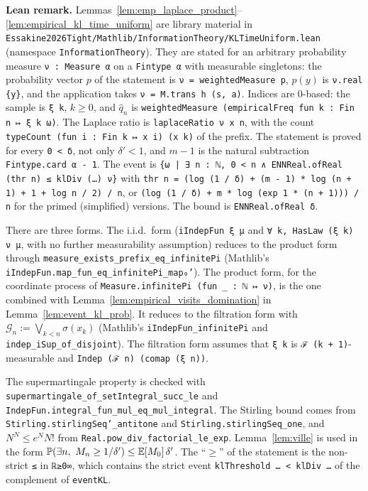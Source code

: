 \textbf{Lean remark.} Lemmas~\ref{lem:emp_laplace_product}--\ref{lem:empirical_kl_time_uniform}
are library material in \texttt{Essakine2026Tight/Mathlib/InformationTheory/KLTimeUniform.lean}
(namespace \texttt{InformationTheory}). They are stated for an arbitrary probability measure
\texttt{ν : Measure α} on a \texttt{Fintype α} with measurable singletons: the probability vector
$p$ of the statement is \texttt{ν = weightedMeasure p}, $p(y)$ is \texttt{ν.real \{y\}}, and the
application takes \texttt{ν = M.trans h (s, a)}. Indices are $0$-based: the sample is
\texttt{ξ k}, $k \ge 0$, and $\hat q_n$ is
\texttt{weightedMeasure (empiricalFreq fun k : Fin n ↦ ξ k ω)}. The Laplace ratio is
\texttt{laplaceRatio ν x n}, with the count \texttt{typeCount (fun i : Fin k ↦ x i) (x k)} of the
prefix. The statement is proved for every \texttt{0 < δ}, not only $\delta' < 1$, and $m - 1$ is
the natural subtraction \texttt{Fintype.card α - 1}. The event is
\texttt{\{ω | ∃ n : ℕ, 0 < n ∧ ENNReal.ofReal (thr n) ≤ klDiv (…) ν\}} with
\texttt{thr n = (log (1 / δ) + (m - 1) * log (n + 1) + 1 + log n / 2) / n}, or
\texttt{(log (1 / δ) + m * log (exp 1 * (n + 1))) / n} for the primed (simplified) versions. The
bound is \texttt{ENNReal.ofReal δ}.

There are three forms. The i.i.d.\ form (\texttt{iIndepFun ξ μ} and
\texttt{∀ k, HasLaw (ξ k) ν μ}, with no further measurability assumption) reduces to the product
form through \texttt{measure\_exists\_prefix\_eq\_infinitePi} (Mathlib's
\texttt{iIndepFun.map\_fun\_eq\_infinitePi\_map₀'}). The product form, for the coordinate process of
\texttt{Measure.infinitePi (fun \_ : ℕ ↦ ν)}, is the one combined with
Lemma~\ref{lem:empirical_visits_domination} in Lemma~\ref{lem:event_kl_prob}. It reduces to the
filtration form with $\mathcal G_n := \bigvee_{k < n} \sigma(x_k)$ (Mathlib's
\texttt{iIndepFun\_infinitePi} and \texttt{indep\_iSup\_of\_disjoint}). The filtration form assumes
that \texttt{ξ k} is \texttt{ℱ (k + 1)}-measurable and \texttt{Indep (ℱ n) (comap (ξ n))}.

The supermartingale property is checked with \texttt{supermartingale\_of\_setIntegral\_succ\_le}
and \texttt{IndepFun.integral\_fun\_mul\_eq\_mul\_integral}. The Stirling bound comes from
\texttt{Stirling.stirlingSeq'\_antitone} and \texttt{Stirling.stirlingSeq\_one}, and
$N^N \le e^N N!$ from \texttt{Real.pow\_div\_factorial\_le\_exp}. Lemma~\ref{lem:ville} is used in
the form $\mathbb{P}(\exists n,\ M_n \ge 1/\delta') \le \mathbb{E}[M_0]\,\delta'$. The ``$\ge$'' of the
statement is the non-strict \texttt{≤} in \texttt{ℝ≥0∞}, which contains the strict event
\texttt{klThreshold … < klDiv …} of the complement of \texttt{eventKL}.

